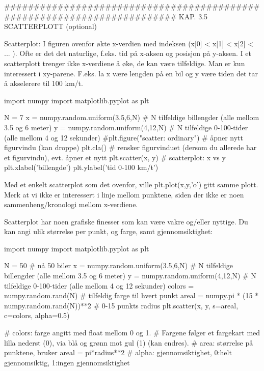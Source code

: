 ######################################################################## 
KAP. 3.5  SCATTERPLOTT  (optional)

Scatterplot:
I figuren ovenfor økte x-verdien med indeksen (x[0] < x[1] < x[2] < ... ). 
Ofte er det det naturlige, f.eks. tid på x-aksen og posisjon på y-aksen. 
I et scatterplott trenger ikke x-verdiene å øke, de kan være tilfeldige. 
Man er kun interessert i xy-parene. 
F.eks. la x være lengden på en bil og y være tiden det tar å akselerere til 100 km/t.

import numpy 
import matplotlib.pyplot as plt

N = 7
x = numpy.random.uniform(3.5,6,N)   # N tilfeldige billengder (alle mellom 3.5 og 6 meter)
y = numpy.random.uniform(4,12,N)    # N tilfeldige 0-100-tider (alle mellom 4 og 12 sekunder)
#plt.figure("scatter: ordinary")    # åpner nytt figurvindu  (kan droppe)
plt.cla()                           # rensker figurvinduet (dersom du allerede har et figurvindu), evt. åpner et nytt
plt.scatter(x, y)                   # scatterplot: x vs y
plt.xlabel('billengde')
plt.ylabel('tid 0-100 km/t')

Med et enkelt scatterplot som det ovenfor, ville plt.plot(x,y,'o') gitt samme plott. 
Merk at vi ikke er interessert i linje mellom punktene, siden der ikke er noen sammenheng/kronologi
mellom x-verdiene. 



Scatterplot har noen grafiske finesser som kan være vakre og/eller nyttige.
Du kan angi ulik størrelse per punkt, og farge, samt gjennomsiktighet: 

import numpy 
import matplotlib.pyplot as plt

N = 50   # nå 50 biler 
x = numpy.random.uniform(3.5,6,N)   # N tilfeldige billengder (alle mellom 3.5 og 6 meter)
y = numpy.random.uniform(4,12,N)    # N tilfeldige 0-100-tider (alle mellom 4 og 12 sekunder)
colors = numpy.random.rand(N)       # tilfeldig farge til hvert punkt
areal = numpy.pi * (15 * numpy.random.rand(N))**2    # 0-15 punkts radius 
plt.scatter(x, y, s=areal, c=colors, alpha=0.5)

# colors: farge angitt med float mellom 0 og 1.
# Fargene følger et fargekart med lilla nederst (0), via blå og grønn mot gul (1) (kan endres). 
# area: størrelse på punktene, bruker areal = pi*radius**2
# alpha: gjennomsiktighet, 0:helt gjennomsiktig, 1:ingen gjennomsiktighet




